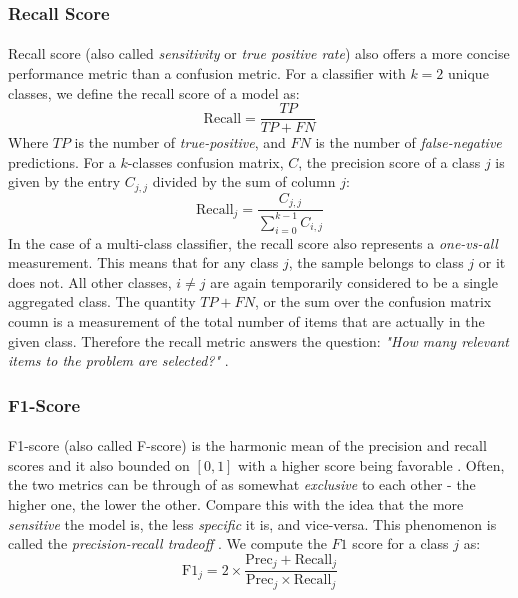 \documentclass[12pt,letterpaper]{article}
\begin{document}

\subsubsection{Recall Score}

\paragraph*{}Recall score (also called \textit{sensitivity} or \textit{true positive rate}) also offers a more concise performance metric than a confusion metric. For a classifier with $k = 2$ unique classes, we define the recall score of a model as:
\begin{equation}
\label{eqn-BinaryRecall}
\text{Recall} = \frac{TP}{TP + FN}
\end{equation}
Where $TP$ is the number of \textit{true-positive}, and $FN$ is the number of \textit{false-negative} predictions. For a $k$-classes confusion matrix, $C$, the precision score of a class $j$ is given by the entry $C_{j,j}$ divided by the sum of column $j$:
\begin{equation}
\label{eqn-KRecall}
\text{Recall}_j = \frac{C_{j,j}}{\sum_{i=0}^{k-1}C_{i,j}}
\end{equation}
In the case of a multi-class classifier, the recall score also represents a \textit{one-vs-all} measurement. This means that for any class $j$, the sample belongs to class $j$ or it does not. All other classes, $i \neq j$ are again temporarily considered to be a single aggregated class. The quantity $TP + FN$, or the sum over the confusion matrix coumn is a measurement of the total number of items that are actually in the given class. Therefore the recall metric answers the question: \textit{"How many relevant items to the problem are selected?"} \cite{Geron,James}.


\subsubsection{F1-Score}

\paragraph*{}F1-score (also called F-score) is the harmonic mean of the precision and recall scores and it also bounded on $[0,1]$ with a higher score being favorable \cite{Geron}. Often, the two metrics can be through of as somewhat \textit{exclusive} to each other - the higher one, the lower the other. Compare this with the idea that the more \textit{sensitive} the model is, the less \textit{specific} it is, and vice-versa. This phenomenon is called the \textit{precision-recall tradeoff} \cite{Geron,James}. We compute the $F1$ score for a class $j$ as:
\begin{equation}
\label{eqn-F1Score}
\text{F1}_{j} = 2 \times \frac{\text{Prec}_j + \text{Recall}_j}{\text{Prec}_j \times \text{Recall}_j}
\end{equation}
\end{document}
